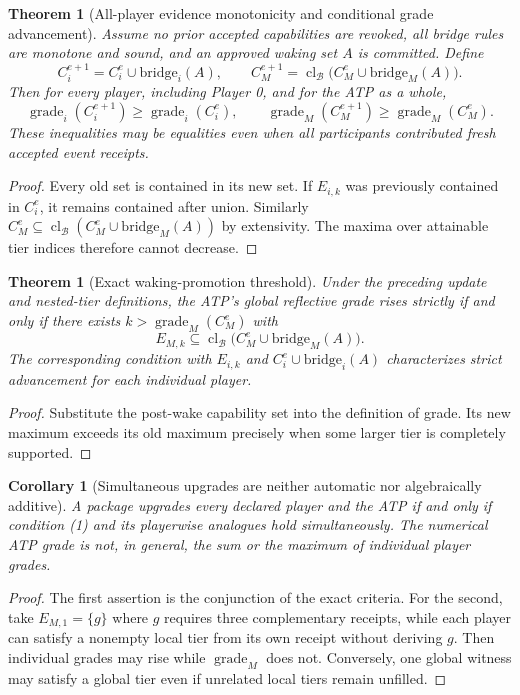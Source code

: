 \documentclass[11pt,letterpaper]{article}
\theoremstyle{definition}
\theoremstyle{plain}
\newtheorem{theorem}[definition]{Theorem}
\newtheorem{corollary}[definition]{Corollary}
\theoremstyle{definition}
\newcommand{\cl}{\operatorname{cl}}
\newcommand{\Grade}{\operatorname{grade}}
\newcommand{\B}{\mathcal B}
\begin{document}
\begin{theorem}[All-player evidence monotonicity and conditional grade advancement]
Assume no prior accepted capabilities are revoked, all bridge rules are monotone and sound, and an approved waking set $A$ is committed. Define
\[
 C_i^{e+1}=C_i^e\cup\mathrm{bridge}_i(A),\qquad
 C_M^{e+1}=\cl_{\B}\big(C_M^e\cup\mathrm{bridge}_M(A)\big).
\]
Then for every player, \emph{including Player 0}, and for the ATP as a whole,
\[
 \Grade_i(C_i^{e+1})\ge\Grade_i(C_i^e),\qquad
 \Grade_M(C_M^{e+1})\ge\Grade_M(C_M^e).
\]
These inequalities may be equalities even when all participants contributed fresh accepted event receipts.
\end{theorem}
\begin{proof}
Every old set is contained in its new set. If $E_{i,k}$ was previously contained in $C_i^e$, it remains contained after union. Similarly $C_M^e\subseteq\cl_{\B}(C_M^e\cup\mathrm{bridge}_M(A))$ by extensivity. The maxima over attainable tier indices therefore cannot decrease.
\end{proof}

\begin{theorem}[Exact waking-promotion threshold]
Under the preceding update and nested-tier definitions, the ATP's global reflective grade rises strictly if and only if there exists $k>\Grade_M(C_M^e)$ with
\[
 E_{M,k}\subseteq\cl_{\B}\big(C_M^e\cup\mathrm{bridge}_M(A)\big).
\tag{1}
\]
The corresponding condition with $E_{i,k}$ and $C_i^e\cup\mathrm{bridge}_i(A)$ characterizes strict advancement for each individual player.
\end{theorem}
\begin{proof}Substitute the post-wake capability set into the definition of grade. Its new maximum exceeds its old maximum precisely when some larger tier is completely supported.\end{proof}

\begin{corollary}[Simultaneous upgrades are neither automatic nor algebraically additive]
A package upgrades \emph{every} declared player and the ATP if and only if condition (1) and its playerwise analogues hold simultaneously. The numerical ATP grade is not, in general, the sum or the maximum of individual player grades.
\end{corollary}
\begin{proof}The first assertion is the conjunction of the exact criteria. For the second, take $E_{M,1}=\{g\}$ where $g$ requires three complementary receipts, while each player can satisfy a nonempty local tier from its own receipt without deriving $g$. Then individual grades may rise while $\Grade_M$ does not. Conversely, one global witness may satisfy a global tier even if unrelated local tiers remain unfilled.\end{proof}
\end{document}

